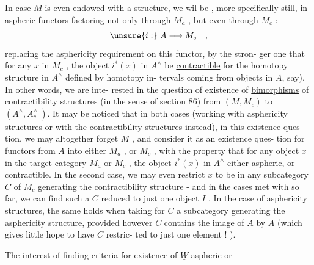 In case  $M$ is even endowed with a  structure,  we wil
be , more specifically still,  in aspheric functors factoring not only
through $M_a$ ,  but even through $M_c$ :
\[ \unsure{i:}\ A \longrightarrow M_c \quad , \]
 replacing the asphericity requirement on this functor,  by the stron-%
ger one that for  any $x$ in $M_c$ ,  the object $i^*(x)$ in $A^\wedge$ be \uline{contractible}
\hand{(}for the homotopy structure in $A^\wedge$  defined by homotopy in-%
tervals coming from objects in $A$,  say).  In other words,  we are inte-%
rested in the question of existence of \uline{bimorphisms}  of contractibility
structures  (in the sense of section 86)  from $(M,M_c)$  to  $(A^\wedge,A^\wedge_c\ )$.
It may be noticed that in both cases (working with asphericity structures
or with the contractibility structures instead),  in this existence ques-%
tion,  we may altogether forget $M$ ,  and consider it as an existence ques-%
tion for functors from $A$ into either $M_a$  ,  or $M_c$ ,  with the property
that for any object $x$ in the target category $M_a$ or $M_c$ ,  the object
$i^*(x)$  in $A^\wedge$  either aspheric,  or contractible.  In the  second
case,  we may even restrict $x$ to be in any  subcategory $C$ of $M_c$
generating the contractibility structure  -  and in the cases met with so
far,  we can find such a $C$ reduced to just one object  $I$ .  In the case
of asphericity structures,   the same holds when taking for $C$ a
subcategory generating the asphericity structure,  provided however $C$
contains the image of $A$ by $A$  (which gives little hope to have $C$ restric-%
ted to just one element ! ).

The interest of finding criteria for existence of $\underline{W}$-aspheric or

